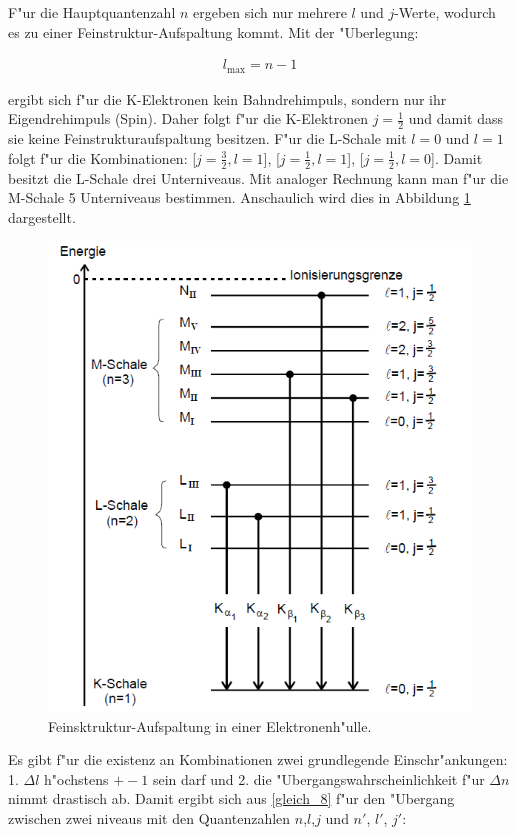 		F"ur die Hauptquantenzahl $n$ ergeben sich nur mehrere $l$ und $j$-Werte, wodurch es zu einer Feinstruktur-Aufspaltung kommt.
		Mit der "Uberlegung:

		\begin{eqnarray*}
			l_\mathrm{max} = n - 1
		\end{eqnarray*}

		ergibt sich f"ur die K-Elektronen kein Bahndrehimpuls, sondern nur ihr Eigendrehimpuls (Spin). 
		Daher folgt f"ur die K-Elektronen $j = \frac{1}{2}$ und damit dass sie keine Feinstrukturaufspaltung besitzen.
		F"ur die L-Schale mit $l = 0$ und $l = 1$ folgt f"ur die Kombinationen: [$j = \frac{3}{2}, l = 1$], [$j = \frac{1}{2}, l = 1$], [$j = \frac{1}{2}, l = 0$].
		Damit besitzt die L-Schale drei Unterniveaus.
		Mit analoger Rechnung kann man f"ur die M-Schale 5 Unterniveaus bestimmen.
		Anschaulich wird dies in Abbildung \ref{roentgenfein} dargestellt.

		\begin{figure}[htbp]
			\centering
			\includegraphics[width = 12cm]{img/Roentgenuebergaengefein.png}
			\caption{Feinsktruktur-Aufspaltung in einer Elektronenh"ulle.}
			\label{roentgenfein}
		\end{figure}	

		Es gibt f"ur die existenz an Kombinationen zwei grundlegende Einschr"ankungen: 
		1. $\Delta l$ h"ochstens $+- 1$ sein darf und 2. die "Ubergangswahrscheinlichkeit f"ur $\Delta n$  nimmt drastisch ab. 
		Damit ergibt sich aus \ref{gleich_8} f"ur den "Ubergang zwischen zwei niveaus mit den Quantenzahlen $n$,$l$,$j$ und $n'$, $l'$, $j'$:	

